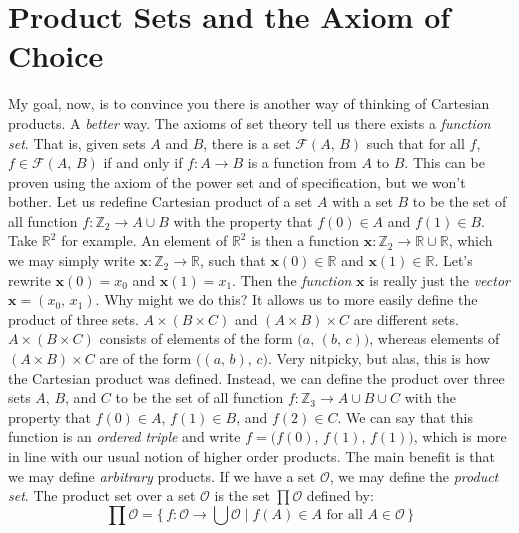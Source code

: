 \documentclass{article}
\theoremstyle{plain}
\theoremstyle{normal}
\newenvironment{definition}{%
    \pushQED{\qed}\renewcommand{\qedsymbol}{$\blacksquare$}\definitionx%
}{%
    \popQED\enddefinitionx%
}
\begin{document}
    \section{Product Sets and the Axiom of Choice}
        My goal, now, is to convince you there is another way of thinking of
        Cartesian products. A \textit{better} way. The axioms of set theory
        tell us there exists a \textit{function set}. That is, given sets $A$
        and $B$, there is a set $\mathcal{F}(A,\,B)$ such that for all $f$,
        $f\in\mathcal{F}(A,\,B)$ if and only if $f:A\rightarrow{B}$ is a
        function from $A$ to $B$. This can be proven using the axiom of the
        power set and of specification, but we won't bother. Let us redefine
        Cartesian product of a set $A$ with a set $B$ to be the set of all
        function $f:\mathbb{Z}_{2}\rightarrow{A}\cup{B}$ with the property
        that $f(0)\in{A}$ and $f(1)\in{B}$. Take $\mathbb{R}^{2}$ for example.
        An element of $\mathbb{R}^{2}$ is then a function
        $\mathbf{x}:\mathbb{Z}_{2}\rightarrow\mathbb{R}\cup\mathbb{R}$,
        which we may simply write
        $\mathbf{x}:\mathbb{Z}_{2}\rightarrow\mathbb{R}$, such that
        $\mathbf{x}(0)\in\mathbb{R}$ and $\mathbf{x}(1)\in\mathbb{R}$.
        Let's rewrite $\mathbf{x}(0)=x_{0}$ and $\mathbf{x}(1)=x_{1}$.
        Then the \textit{function} $\mathbf{x}$ is really just the
        \textit{vector} $\mathbf{x}=(x_{0},\,x_{1})$. Why might we do this?
        It allows us to more easily define the product of three sets.
        $A\times(B\times{C})$ and $(A\times{B})\times{C}$ are different sets.
        $A\times(B\times{C})$ consists of elements of the form
        $\big(a,\,(b,\,c)\big)$, whereas elements of
        $(A\times{B})\times{C}$ are of the form
        $\big((a,\,b),\,c\big)$. Very nitpicky, but alas, this is how the
        Cartesian product was defined. Instead, we can define the product over
        three sets $A$, $B$, and $C$ to be the set of all function
        $f:\mathbb{Z}_{3}\rightarrow{A}\cup{B}\cup{C}$ with the property that
        $f(0)\in{A}$, $f(1)\in{B}$, and $f(2)\in{C}$. We can say that this
        function is an \textit{ordered triple} and write
        $f=\big(f(0),\,f(1),\,f(1)\big)$, which is more in line with our usual
        notion of higher order products. The main benefit is that we may define
        \textit{arbitrary} products. If we have a set $\mathcal{O}$, we may
        define the \textit{product set}.
        \begin{definition}[\textbf{Product Set}]
            The product set over a set $\mathcal{O}$ is the set
            $\prod\mathcal{O}$ defined by:
            \begin{equation}
                \prod\mathcal{O}=\{\,f:\mathcal{O}\rightarrow\bigcup\mathcal{O}
                    \;|\;f(A)\in{A}\textrm{ for all }A\in\mathcal{O}\,\}
            \end{equation}
        \end{definition}
\end{document}
